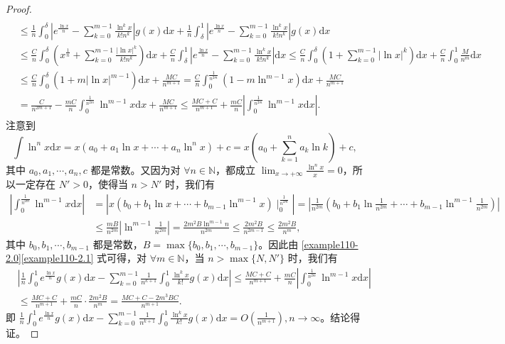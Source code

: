 \documentclass[../../main.tex]{subfiles}%
\begin{document}
\begin{proof}
\begin{align}
\\
&\leqslant \frac{1}{n}\int_0^{\delta}{\left| e^{\frac{\ln x}{n}}-\sum_{k=0}^{m-1}{\frac{\ln ^kx}{k!n^k}} \right|g\left( x \right) \mathrm{d}x}+\frac{1}{n}\int_{\delta}^1{\left| e^{\frac{\ln x}{n}}-\sum_{k=0}^{m-1}{\frac{\ln ^kx}{k!n^k}} \right|g\left( x \right) \mathrm{d}x}
\nonumber
\\
&\leqslant \frac{C}{n}\int_0^{\delta}{\left( x^{\frac{1}{n}}+\sum_{k=0}^{m-1}{\frac{\left| \ln x \right|^k}{k!n^k}} \right) \mathrm{d}x}+\frac{C}{n}\int_{\delta}^1{\left| e^{\frac{\ln x}{n}}-\sum_{k=0}^{m-1}{\frac{\ln ^kx}{k!n^k}} \right|\mathrm{d}x}\leqslant \frac{C}{n}\int_0^{\delta}{\left( 1+\sum_{k=0}^{m-1}{\left| \ln x \right|^k} \right) \mathrm{d}x}+\frac{C}{n}\int_0^1{\frac{M}{n^m}\mathrm{d}x}
\nonumber
\\
&\leqslant \frac{C}{n}\int_0^{\delta}{\left( 1+m\left| \ln x \right|^{m-1} \right) \mathrm{d}x}+\frac{MC}{n^{m+1}}=\frac{C}{n}\int_0^{\frac{1}{n^{2m}}}{\left( 1-m\ln ^{m-1}x \right) \mathrm{d}x}+\frac{MC}{n^{m+1}}
\nonumber
\\
&=\frac{C}{n^{2m+1}}-\frac{mC}{n}\int_0^{\frac{1}{n^{2m}}}{\ln ^{m-1}x\mathrm{d}x}+\frac{MC}{n^{m+1}}\leqslant \frac{MC+C}{n^{m+1}}+\frac{mC}{n}\left| \int_0^{\frac{1}{n^{2m}}}{\ln ^{m-1}x\mathrm{d}x} \right|.\label{example110-2.0}
\end{align}
注意到
\[
\int\ln^n x\mathrm{d}x=x\left(a_0 + a_1\ln x+\cdots + a_n\ln^n x\right)+c=x\left(a_0+\sum_{k = 1}^{n}a_k\ln k\right)+c,
\]
其中 \(a_0,a_1,\cdots,a_n,c\) 都是常数。又因为对 \(\forall n\in\mathbb{N}\)，都成立 \(\lim_{x\rightarrow +\infty}\frac{\ln^n x}{x}=0\)，所以一定存在 \(N'>0\)，使得当 \(n > N'\) 时，我们有
\begin{align}
\left| \int_0^{\frac{1}{n^{2m}}}{\ln ^{m-1}x\mathrm{d}x} \right|&=\left| x\left( b_0+b_1\ln x+\cdots +b_{m-1}\ln ^{m-1}x \right) \mid_{0}^{\frac{1}{n^{2m}}} \right|=\left| \frac{1}{n^{2m}}\left( b_0+b_1\ln \frac{1}{n^{2m}}+\cdots +b_{m-1}\ln ^{m-1}\frac{1}{n^{2m}} \right) \right|
\nonumber
\\
&\leqslant \frac{mB}{n^{2m}}\left| \ln ^{m-1}\frac{1}{n^{2m}} \right|=\frac{2m^2B\ln ^{m-1}n}{n^{2m}}\leqslant \frac{2m^2B}{n^{2m-1}}\leqslant \frac{2m^2B}{n^m},\label{example110-2.1}
\end{align}
其中 \(b_0,b_1,\cdots,b_{m - 1}\) 都是常数，\(B = \max\{b_0,b_1,\cdots,b_{m - 1}\}\)。因此由 \eqref{example110-2.0}\eqref{example110-2.1} 式可得，对 \(\forall m\in\mathbb{N}\)，当 \(n>\max\{N,N'\}\) 时，我们有
\begin{align*}
&\left|\frac{1}{n}\int_{0}^{1}e^{\frac{\ln x}{n}}g(x)\mathrm{d}x-\sum_{k = 0}^{m - 1}\frac{1}{n^{k + 1}}\int_{0}^{1}\frac{\ln^k x}{k!}g(x)\mathrm{d}x\right|
\leqslant\frac{MC + C}{n^{m + 1}}+\frac{mC}{n}\left|\int_{0}^{\frac{1}{n^{2m}}}\ln^{m - 1}x\mathrm{d}x\right|
\\
&\leqslant\frac{MC + C}{n^{m + 1}}+\frac{mC}{n}\cdot\frac{2m^2B}{n^m}
=\frac{MC + C-2m^3BC}{n^{m + 1}}.
\end{align*}
即 \(\frac{1}{n}\int_{0}^{1}e^{\frac{\ln x}{n}}g(x)\mathrm{d}x-\sum_{k = 0}^{m - 1}\frac{1}{n^{k + 1}}\int_{0}^{1}\frac{\ln^k x}{k!}g(x)\mathrm{d}x=O\left(\frac{1}{n^{m + 1}}\right),n\rightarrow\infty\)。结论得证。

\end{proof}
\end{document}
